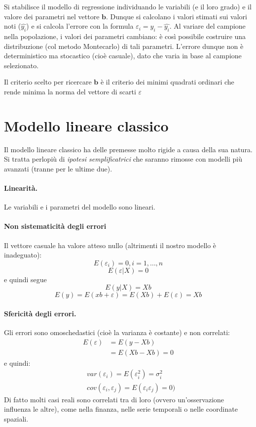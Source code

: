 \documentclass[11pt, twocolumn]{article}
\begin{document}
Si stabilisce il modello di regressione individuando le variabili (e il loro grado) e il valore dei parametri nel vettore $\textbf{b}$.
Dunque si calcolano i valori stimati sui valori noti ($\hat{y_i}$) e si calcola l'errore con la formula $\varepsilon_i = y_i - \hat{y_i}$.
Al variare del campione nella popolazione, i valori dei parametri cambiano: è così possibile costruire una distribuzione (col metodo Montecarlo) di tali parametri.
L'errore dunque non è deterministico ma stocastico (cioè casuale), dato che varia in base al campione selezionato.

Il criterio scelto per ricercare $\textbf{b}$ è il criterio dei minimi quadrati ordinari che rende minima la norma del vettore di scarti $\varepsilon$

\newpage
\part{Modello lineare classico}
Il modello lineare classico ha delle premesse molto rigide a causa della sua natura.
Si tratta perlopiù di \textit{ipotesi semplificatrici} che saranno rimosse con modelli più avanzati (tranne per le ultime due).

\subsection*{Linearità.}
Le variabili e i parametri del modello sono lineari.

\subsection*{Non sistematicità degli errori}
Il vettore casuale ha valore atteso nullo (altrimenti il nostro modello è inadeguato):
\begin{equation*}
  E(\varepsilon_i)=0, i=1,\hdots,n 
\end{equation*}
$$E(\varepsilon|X)=0$$
e quindi segue
\begin{equation*}
  E(y | X) = Xb
\end{equation*}
\begin{equation*}
E(y) = E(xb+\varepsilon) = E(Xb)+E(\varepsilon) = Xb
\end{equation*}

\subsection*{Sfericità degli errori.}
Gli errori sono omoschedastici (cioè la varianza è costante) e non correlati:
\begin{align*}
  E(\varepsilon) &= E(y - Xb) \\
              &= E(Xb - Xb) = 0
\end{align*}
e quindi:
\begin{align*}
  &var(\varepsilon_i) = E(\varepsilon_i^2) = \sigma_i^2 \\
  &cov(\varepsilon_i, \varepsilon_j) = E(\varepsilon_i\varepsilon_j) = 0)
\end{align*}
Di fatto molti casi reali sono correlati tra di loro (ovvero un'osservazione influenza le altre), come nella finanza, nelle serie temporali o nelle coordinate spaziali.
\end{document}
